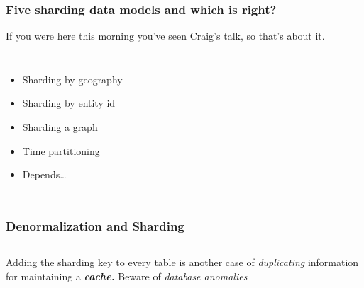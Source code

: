 \documentclass[xcolor=dvipsnames]{beamer}
\begin{document}
{
  \begin{frame}
    \frametitle{Five sharding data models and which is right?}

    If you were here this morning you've seen Craig's talk, so that's about it.
    \vfill

    \begin{columns}[c]
      \begin{itemize}
      \item Sharding by geography
      \item Sharding by entity id
      \item Sharding a graph
      \item Time partitioning
      \item Depends…
      \end{itemize}
    \end{columns}

  \end{frame}
}

\begin{frame}[fragile]
  \frametitle{Denormalization and Sharding}

  \begin{columns}[c]

    {\Large Adding the sharding key to every table is another case of
      \textit{duplicating} information for maintaining a \textbf{\textit{
          cache.}} Beware of \textit{database anomalies}}
  \end{columns}
\end{frame}
\end{document}
